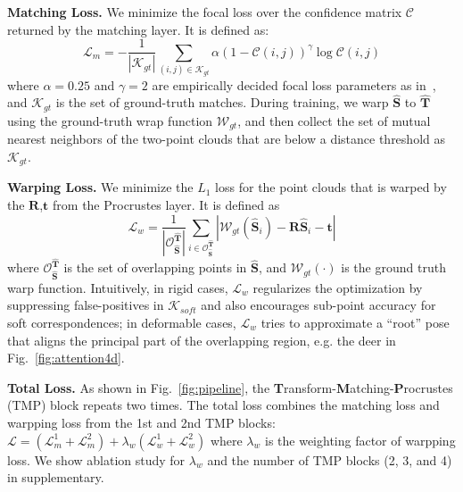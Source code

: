 \medskip
\noindent
\textbf{Matching Loss.}
We minimize the focal loss over the confidence matrix $\mathcal{C}$ returned by the matching layer. 
It is defined as:
$$
\mathcal{L}_m = -  \frac{1}{|\mathcal{K}_{gt}|} \sum_{(i,j)\in \mathcal{K}_{gt} } \alpha (1-\mathcal{C}(i,j))^{\gamma} \log \mathcal{C}(i,j)
$$
where $\alpha=0.25$ and $\gamma=2$ are empirically decided focal loss parameters as in~\cite{focal_loss}, and $\mathcal{K}_{gt}$ is the set of ground-truth matches.
During training, we warp $\mathbf{\hat{S}} $ to $\mathbf{\hat{T}} $ using the ground-truth wrap function $\mathcal{W}_{gt}$, and then collect the set of mutual nearest neighbors of the two-point clouds that are below a distance threshold as $\mathcal{K}_{gt}$. 


\medskip
\noindent
\textbf{Warping Loss.}
We minimize the $L_1$ loss for the point clouds that is warped by the $\mathbf{R}$,$\mathbf{t}$ from the Procrustes layer. It is defined as
$$\mathcal{L}_w = \frac{1}{|\mathcal{O}^{ \mathbf{\hat{T}}}_{ \mathbf{\hat{S}} }|} 
\sum_{i \in \mathcal{O}^{ \mathbf{\hat{T}} }_{ \mathbf{\hat{S}}}} 
| \mathcal{W}_{gt}(\mathbf{\hat{S}}_i) - \mathbf{R}\mathbf{\hat{S}}_i - \mathbf{t} | $$
where $\mathcal{O}^{\mathbf{\hat{T}}}_{ \mathbf{\hat{S}} }$ is the set of overlapping points in $\mathbf{\hat{S}}$, and $\mathcal{W}_{gt}(\cdot)$ is the ground truth warp function.
Intuitively, in rigid cases, $\mathcal{L}_w$ regularizes the optimization by suppressing false-positives in $\mathcal{K}_{soft}$ and also encourages sub-point accuracy for soft correspondences; 
in deformable cases, $\mathcal{L}_w$ tries to approximate a ``root'' pose that aligns the principal part of the overlapping region, e.g. the deer in Fig.~\ref{fig:attention4d}.


 

 
\medskip
\noindent
\textbf{Total Loss.}
As shown in Fig.~\ref{fig:pipeline}, the \textbf{T}ransform-\textbf{M}atching-\textbf{P}rocrustes (TMP) block repeats two times. The total loss combines the matching loss and warpping loss from the 1st and 2nd TMP blocks:
$
\mathcal{L} = (\mathcal{L}_m^1 + \mathcal{L}_m^2)  + \lambda_w (\mathcal{L}_w^1 + \mathcal{L}_w^2 )
$
where $\lambda_w$ is the weighting factor of warpping loss.  We show ablation study for $\lambda_w$ and the number of TMP blocks (2, 3, and 4) in supplementary.
